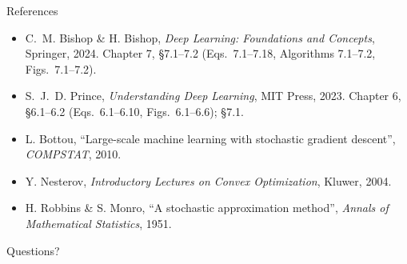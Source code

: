 \documentclass[aspectratio=169, 11pt]{beamer}
\newcommand{\nosrc}{}       %
\begin{document}
\begin{frame}{References}
  \nosrc
  \vspace{0.25em}
  {\scriptsize
  \begin{itemize}\itemsep0.30em
    \item C.~M. Bishop \& H. Bishop, \emph{Deep Learning: Foundations
          and Concepts}, Springer, 2024. Chapter 7, \S7.1--7.2
          (Eqs.~7.1--7.18, Algorithms 7.1--7.2, Figs.~7.1--7.2).
    \item S.~J.~D. Prince, \emph{Understanding Deep Learning}, MIT
          Press, 2023. Chapter 6, \S6.1--6.2 (Eqs.~6.1--6.10,
          Figs.~6.1--6.6); \S7.1.
    \item L. Bottou, ``Large-scale machine learning with stochastic
          gradient descent'', \emph{COMPSTAT}, 2010.
    \item Y. Nesterov, \emph{Introductory Lectures on Convex
          Optimization}, Kluwer, 2004.
    \item H. Robbins \& S. Monro, ``A stochastic approximation method'',
          \emph{Annals of Mathematical Statistics}, 1951.
  \end{itemize}}
\end{frame}

\begin{frame}[standout]
  \nosrc
  Questions?
\end{frame}
\end{document}
